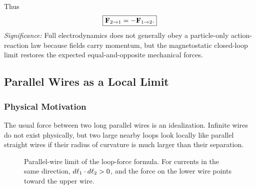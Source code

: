 Thus
\begin{equation}\label{eq:lec14-newton-third-law}
  \boxed{\mathbf{F}_{2\to1}=-\mathbf{F}_{1\to2}.}
\end{equation}
\textit{Significance:} Full electrodynamics does not generally obey a particle-only
action-reaction law because fields carry momentum, but the magnetostatic closed-loop
limit restores the expected equal-and-opposite mechanical forces.

\subsection{Parallel Wires as a Local Limit}\label{subsec:lec14-parallel-wires}

\subsubsection*{Physical Motivation}
The usual force between two long parallel wires is an idealization.  Infinite wires do
not exist physically, but two large nearby loops look locally like parallel straight
wires if their radius of curvature is much larger than their separation.

\begin{figure}[h]
\centering
{}
\caption{Parallel-wire limit of the loop-force formula.  For currents in the same
direction, $d\mathbf{\ell}_1\cdot d\mathbf{\ell}_2>0$, and the force on the lower wire points
toward the upper wire.}
\label{fig:lec14-parallel-wires}
\end{figure}

